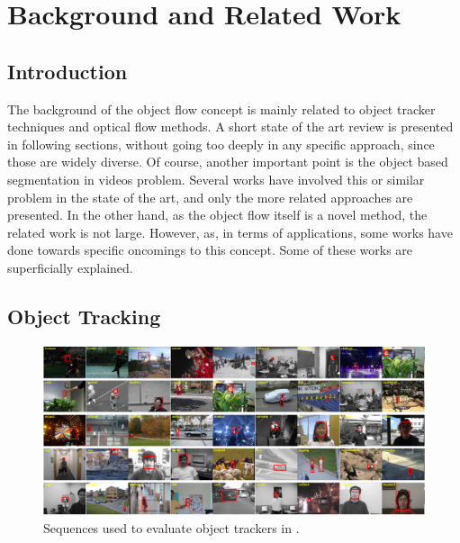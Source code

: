 \chapter{Background and Related Work} \label{chap:background}

\section{Introduction}

The background of the object flow concept is mainly related to object tracker techniques and optical flow methods. A short state of the art review is presented in 
following sections, without going too deeply in any specific approach, since those are widely diverse. Of course, another important point is the object based segmentation in videos problem. Several works have involved this or similar problem in 
the state of the art, and only the more related approaches are presented. In the other hand, as the object flow itself is a novel method, the related work is not large.
 However, as, in terms of applications, some works have done towards specific oncomings to this concept. Some of these works are superficially explained.

\section{Object Tracking}

   \begin{figure}[thpb]
      \centering
      \includegraphics[width=1.0\textwidth]{../images/tr_db.png}
      \caption{Sequences used to evaluate object trackers in \cite{c16}. }
      \label{tr_db}
   \end{figure}

